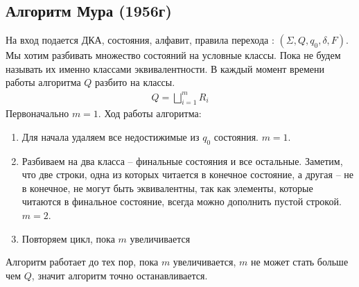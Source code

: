 \subsection*{Алгоритм Мура (1956г)}
На вход подается ДКА, состояния, алфавит, правила перехода : $(\Sigma, Q, q_0, \delta, F)$. Мы хотим разбивать множество состояний на условные классы. Пока не будем называть их именно классами эквивалентности. В каждый момент времени работы алгоритма $Q$ разбито на классы. 
\begin{gather*}
    Q = \bigsqcup\limits_{i = 1}^m R_i
\end{gather*} 
Первоначально $m = 1$. Ход работы алгоритма:
\begin{enumerate}
    \item Для начала удаляем все недостижимые из $q_0$ состояния. $m = 1$.
    \item Разбиваем на два класса -- финальные состояния и все остальные. Заметим, что две строки, одна из которых читается в конечное состояние, а другая -- не в конечное, не могут быть эквивалентны, так как элементы, которые читаются в финальное состояние, всегда можно дополнить пустой строкой. $m = 2$.
    \item Повторяем цикл, пока $m$ увеличивается 
    \begin{figure}[ht]
        \centering
        \begin{minipage}{.7\linewidth}
            \begin{algorithm}[H]
                \DontPrintSemicolon
                \SetAlgoLined
                \SetNoFillComment
            \end{algorithm}
        \end{minipage}
    \end{figure}
\end{enumerate}

Алгоритм работает до тех пор, пока $m$ увеличивается, $m$ не может стать больше чем $Q$, значит алгоритм точно останавливается.


